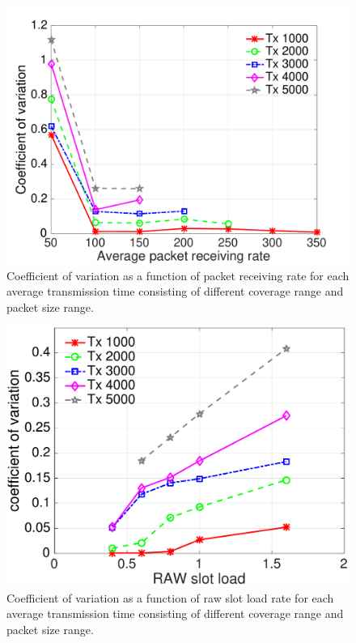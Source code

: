 

\begin{figure}[t]
  \centering
   \includegraphics[width=0.75\columnwidth]{figures/new_load_avg_result_Prate_tx.pdf}
    \caption{Coefficient of variation as a function of packet receiving rate for each average transmission time consisting of different coverage range and packet size range. \label{fig:tx-diff-Prate}}
\end{figure}


\begin{figure}[t]
  \centering
   \includegraphics[width=0.75\columnwidth]{figures/result_new_load_cov_fliter.pdf}
    \caption{Coefficient of variation as a function of \gls{raw} slot load rate for each average transmission time consisting of different coverage range and packet size range.
    \label{fig:tx-diff-load}}
\end{figure}


